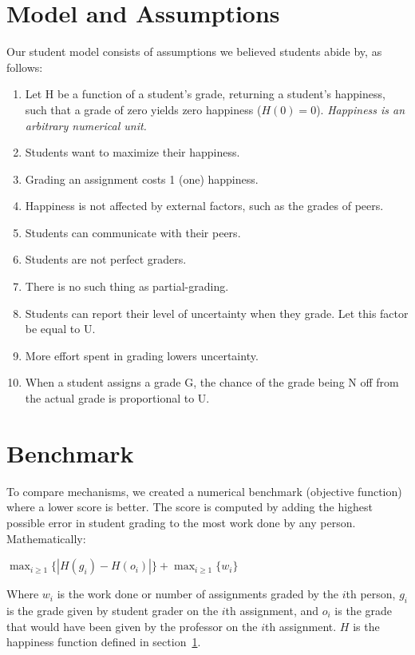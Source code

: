 \documentclass{sigchi}
\begin{document}
\section{Model and Assumptions}
\label{sec:modelandassumptions}
Our student model consists of assumptions we believed students abide by, as follows:
\begin{enumerate}
  \item Let H be a function of a student's grade, returning a student's happiness, such that a grade of zero yields zero happiness ($H(0)=0$). \newline \textit{Happiness is an arbitrary numerical unit.}
  \item Students want to maximize their happiness.
  \item Grading an assignment costs 1 (one) happiness.
  \item Happiness is not affected by external factors, such as the grades of peers.
  \item Students can communicate with their peers.
  \item Students are not perfect graders.
  \item There is no such thing as partial-grading.
  \item Students can report their level of uncertainty when they grade. Let this factor be equal to U.
  \item More effort spent in grading lowers uncertainty.
  \item When a student assigns a grade G, the chance of the grade being N off from the actual grade is proportional to U.
\end{enumerate}

\section{Benchmark}

To compare mechanisms, we created a numerical benchmark (objective function) where a lower score is better. The score is computed by adding the highest possible error in student grading to the most work done by any person. Mathematically:

$\max_{i \ge 1} \{|H(g_i)-H(o_i)|\} + \max_{i \ge 1} \{w_i\}$

Where $w_i$ is the work done or number of assignments graded by the $i$th person, $g_i$ is the grade given by student grader on the $i$th assignment, and $o_i$ is the grade that would have been given by the professor on the $i$th assignment. $H$ is the happiness function defined in section~\ref{sec:modelandassumptions}.
\end{document}
